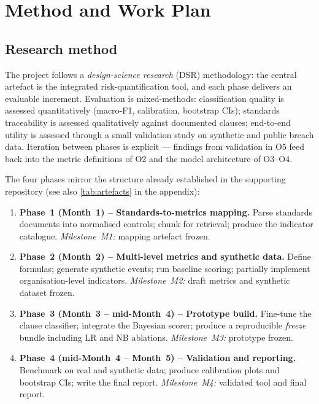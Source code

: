 \documentclass[12pt,a4paper,titlepage]{article}
\let\orgautoref\autoref
\renewcommand{\autoref}[1]{\def\equationautorefname{Eq.}\orgautoref{#1}}
\begin{document}
\section{Method and Work Plan}\label{sec:method}

\subsection{Research method}

The project follows a \emph{design-science research} (DSR) methodology: the central artefact is the integrated risk-quantification tool, and each phase delivers an evaluable increment. Evaluation is mixed-methods: classification quality is assessed quantitatively (macro-F1, calibration, bootstrap CIs); standards traceability is assessed qualitatively against documented clauses; end-to-end utility is assessed through a small validation study on synthetic and public breach data. Iteration between phases is explicit --- findings from validation in O5 feed back into the metric definitions of O2 and the model architecture of O3--O4.

The four phases mirror the structure already established in the supporting repository (see also \autoref{tab:artefacts} in the appendix):

\begin{enumerate}[leftmargin=1.6em]
    \item \textbf{Phase~1 (Month~1) -- Standards-to-metrics mapping.} Parse standards documents into normalised controls; chunk for retrieval; produce the indicator catalogue. \emph{Milestone~M1:} mapping artefact frozen.
    \item \textbf{Phase~2 (Month~2) -- Multi-level metrics and synthetic data.} Define formulas; generate synthetic events; run baseline scoring; partially implement organisation-level indicators. \emph{Milestone~M2:} draft metrics and synthetic dataset frozen.
    \item \textbf{Phase~3 (Month~3 -- mid-Month~4) -- Prototype build.} Fine-tune the clause classifier; integrate the Bayesian scorer; produce a reproducible \emph{freeze} bundle including LR and NB ablations. \emph{Milestone~M3:} prototype frozen.
    \item \textbf{Phase~4 (mid-Month~4 -- Month~5) -- Validation and reporting.} Benchmark on real and synthetic data; produce calibration plots and bootstrap CIs; write the final report. \emph{Milestone~M4:} validated tool and final report.
\end{enumerate}
\end{document}
